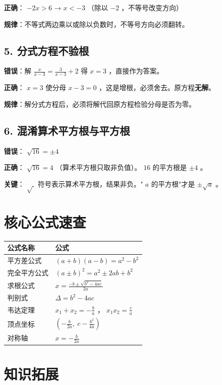 \textbf{正确}： $-2x > 6$ → $x < -3$ （除以 $-2$ ，不等号改变方向）

\textbf{规律}：不等式两边乘以或除以负数时，不等号方向必须翻转。

\subsection*{5. 分式方程不验根}


\textbf{错误}：解 $\frac{x}{x-3} = \frac{3}{x-3} + 2$ 得 $x = 3$ ，直接作为答案。

\textbf{正确}： $x = 3$ 使分母 $x - 3 = 0$ ，这是增根，必须舍去。原方程\textbf{无解}。

\textbf{规律}：解分式方程后，必须将解代回原方程检验分母是否为零。

\subsection*{6. 混淆算术平方根与平方根}


\textbf{错误}： $\sqrt{16} = \pm 4$

\textbf{正确}： $\sqrt{16} = 4$ （算术平方根只取非负值）。 $16$ 的平方根是 $\pm 4$ 。

\textbf{关键}： $\sqrt{\ }$ 符号表示算术平方根，结果非负。" $a$ 的平方根"才是 $\pm\sqrt{a}$ 。

\section*{核心公式速查}


\begin{center}
\begin{tabular}{ll}
\toprule
公式名称 & 公式 \\
\midrule
平方差公式 & $(a+b)(a-b) = a^2 - b^2$ \\
完全平方公式 & $(a \pm b)^2 = a^2 \pm 2ab + b^2$ \\
求根公式 & $x = \frac{-b \pm \sqrt{b^2 - 4ac}}{2a}$ \\
判别式 & $\Delta = b^2 - 4ac$ \\
韦达定理 & $x_1 + x_2 = -\frac{b}{a}$ ， $x_1 x_2 = \frac{c}{a}$ \\
顶点坐标 & $\left(-\frac{b}{2a},\; c - \frac{b^2}{4a}\right)$ \\
对称轴 & $x = -\frac{b}{2a}$ \\
\bottomrule
\end{tabular}
\end{center}


\section*{知识拓展}


